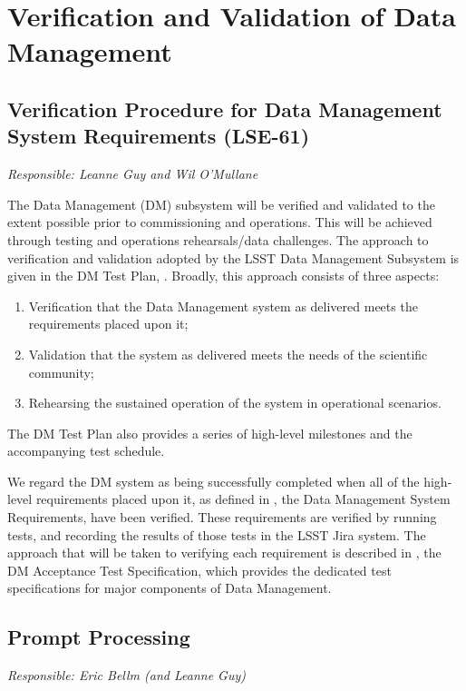 \section{Verification and Validation of Data Management}  \label{sec:dm}

\subsection{Verification Procedure for Data Management System Requirements (LSE-61)}
{\it Responsible: Leanne Guy and Wil O'Mullane}

The Data Management (DM) subsystem will be verified and validated to the extent possible prior to commissioning and operations. 
This will be achieved through testing and operations rehearsals/data challenges. 
The approach to verification and validation adopted by the LSST Data Management Subsystem is given in the DM Test Plan, . 
Broadly, this approach consists of three aspects:
\begin{enumerate}
\item Verification that the Data Management system as delivered meets the requirements placed upon it;
\item Validation that the system as delivered meets the needs of the scientific community;
\item Rehearsing the sustained operation of the system in operational scenarios.
\end{enumerate}
The DM Test Plan also provides a series of high-level milestones and the accompanying test schedule. 

We regard the DM system as being successfully completed when all of the high-level requirements placed upon it, as defined in , the Data Management System Requirements,  have been verified. 
These requirements are verified by running tests, and recording the results of those tests in the LSST Jira system. 
The approach that will be taken to verifying each requirement is described in  , the DM Acceptance Test Specification, which provides the dedicated test specifications for major components of Data Management.


\subsection{Prompt Processing}
{\it Responsible: Eric Bellm (and Leanne Guy)}

